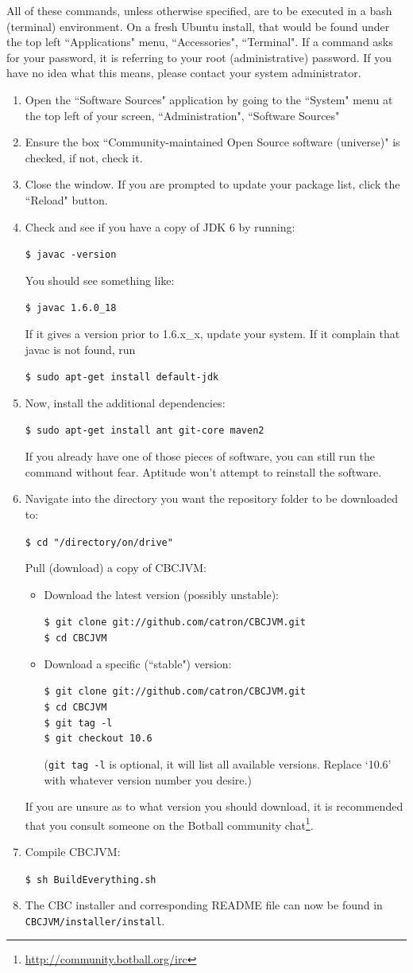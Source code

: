 \documentclass[10pt,letterpaper]{article}
\newcommand{\urlfootnote}[1]{\footnote{\url{#1}}}
\newcommand{\code}[1]{\par\texttt{#1}\par}
\begin{document}
All of these commands, unless otherwise specified, are to be executed in a bash (terminal) environment. On a fresh Ubuntu install, that would be found under the top left ``Applications" menu, ``Accessories", ``Terminal". If a command asks for your password, it is referring to your root (administrative) password. If you have no idea what this means, please contact your system administrator.
\begin{enumerate}
\item Open the ``Software Sources" application by going to the ``System" menu at the top left of your screen, ``Administration", ``Software Sources"
\item Ensure the box ``Community-maintained Open Source software (universe)" is checked, if not, check it.
\item Close the window. If you are prompted to update your package list, click the ``Reload" button.
\item Check and see if you have a copy of JDK 6 by running:
      \code{\$ javac -version}
      You should see something like:
      \code{\$ javac 1.6.0{\_}18}
      If it gives a version prior to 1.6.x{\_}x, update your system. If it complain that javac is not found, run
      \code{\$ sudo apt-get install default-jdk}
\item Now, install the additional dependencies:
      \code{\$ sudo apt-get install ant git-core maven2}
      If you already have one of those pieces of software, you can still run the command without fear. Aptitude won't attempt to reinstall the software.
\item Navigate into the directory you want the repository folder to be downloaded to:
      \code{\$ cd "/directory/on/drive"}
      Pull (download) a copy of CBCJVM:\par
      \begin{itemize}
          \item Download the latest version (possibly unstable):
                \code{\$ git clone git://github.com/catron/CBCJVM.git \\
                      \$ cd CBCJVM}
          \item Download a specific (``stable") version:
                \code{\$ git clone git://github.com/catron/CBCJVM.git \\
                      \$ cd CBCJVM \\
                      \$ git tag -l \\
                      \$ git checkout 10.6}
                (\texttt{git tag -l} is optional, it will list all available versions. Replace `10.6' with whatever version number you desire.)
      \end{itemize}
      If you are unsure as to what version you should download, it is recommended that you consult someone on the Botball community chat\urlfootnote{http://community.botball.org/irc}.
\item Compile CBCJVM:
      \code{\$ sh BuildEverything.sh}
\item The CBC installer and corresponding README file can now be found in \texttt{CBCJVM/installer/install}.
\end{enumerate}
\end{document}
